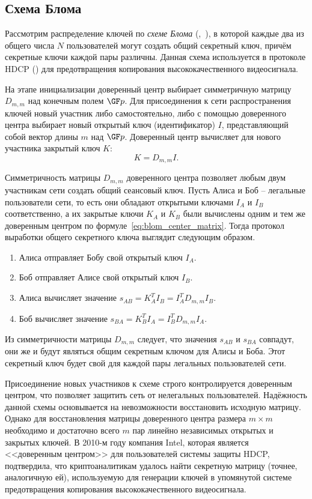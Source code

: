 \subsection{Схема Блома}

Рассмотрим распределение ключей по \emph{схеме Блома} (,~\cite{Blom:1984, Blom:1985}), в которой каждые два  из общего числа $N$ пользователей могут создать общий секретный ключ, причём секретные ключи каждой пары различны. Данная схема используется в протоколе HDCP () для предотвращения копирования высококачественного видеосигнала.

На этапе инициализации доверенный центр выбирает симметричную матрицу $D_{m,m}$ над конечным полем $\GF p$. Для присоединения к сети распространения ключей новый участник либо самостоятельно, либо с помощью доверенного центра выбирает новый открытый ключ (идентификатор) $I$, представляющий собой вектор длины $m$ над $\GF p$. Доверенный центр вычисляет для нового участника закрытый ключ $K$:
\begin{equation}
	K = D_{m,m} I.
	\label{eq:blom_center_matrix}
\end{equation}

Симметричность матрицы $D_{m,m}$ доверенного центра позволяет любым двум участникам сети создать общий сеансовый ключ. Пусть Алиса и Боб -- легальные пользователи сети, то есть они обладают открытыми ключами $I_A$ и $I_B$ соответственно, а их закрытые ключи $K_A$ и $K_B$ были вычислены одним и тем же доверенным центром по формуле~\ref{eq:blom_center_matrix}. Тогда протокол выработки общего секретного ключа выглядит следующим образом.

\begin{enumerate}
	\item Алиса отправляет Бобу свой открытый ключ $I_A$.
	\item Боб отправляет Алисе свой открытый ключ $I_B$.
	\item Алиса вычисляет значение $s_{AB} = K^T_A I_B = I^T_A D_{m,m} I_B$.
	\item Боб вычисляет значение $s_{BA} = K^T_B I_A = I^T_B D_{m,m} I_A$.
\end{enumerate}

Из симметричности матрицы $D_{m,m}$ следует, что значения $s_{AB}$ и $s_{BA}$ совпадут, они же и будут являться общим секретным ключом для Алисы и Боба. Этот секретный ключ будет свой для каждой пары легальных пользователей сети.

Присоединение новых участников к схеме строго контролируется доверенным центром, что позволяет защитить сеть от нелегальных пользователей. Надёжность данной схемы основывается на невозможности восстановить исходную матрицу. Однако для восстановления матрицы доверенного центра размера $m \times m$ необходимо и достаточно всего $m$ пар линейно независимых открытых и закрытых ключей. В 2010-м году компания Intel, которая является <<доверенным центром>> для пользователей системы защиты HDCP, подтвердила, что криптоаналитикам удалось найти секретную матрицу (точнее, аналогичную ей), используемую для генерации ключей в упомянутой системе предотвращения копирования высококачественного видеосигнала.
